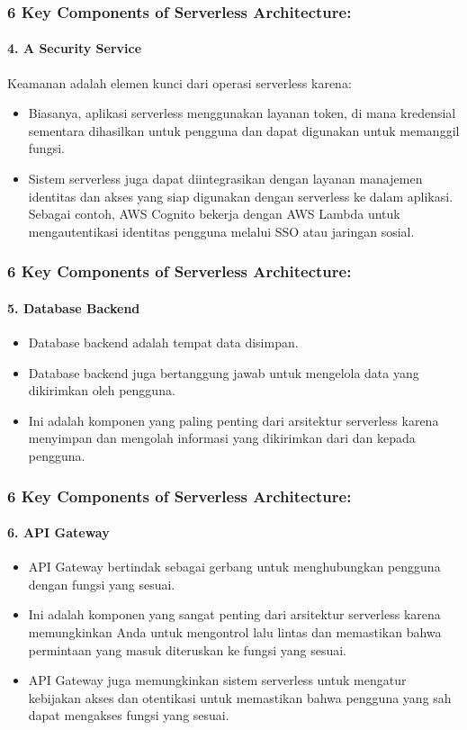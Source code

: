 \documentclass[aspectratio=169, table]{beamer}
\begin{document}
    \begin{frame}\frametitle{6 Key Components of Serverless Architecture:}
        \framesubtitle{4. A Security Service}
        \vspace{20pt}
        Keamanan adalah elemen kunci dari operasi serverless karena:
        \begin{itemize}
            \item Biasanya, aplikasi serverless menggunakan layanan token, di mana kredensial sementara dihasilkan untuk pengguna dan dapat digunakan untuk memanggil fungsi.
            \item Sistem serverless juga dapat diintegrasikan dengan layanan manajemen identitas dan akses yang siap digunakan dengan serverless ke dalam aplikasi. Sebagai contoh, AWS Cognito bekerja dengan AWS Lambda untuk mengautentikasi identitas pengguna melalui SSO atau jaringan sosial.
        \end{itemize}
    \end{frame}


    \begin{frame}\frametitle{6 Key Components of Serverless Architecture: }
        \framesubtitle{5. Database Backend}
        \begin{itemize}
            \item Database backend adalah tempat data disimpan.
            \item Database backend juga bertanggung jawab untuk mengelola data yang dikirimkan oleh pengguna.
            \item Ini adalah komponen yang paling penting dari arsitektur serverless karena menyimpan dan mengolah informasi yang dikirimkan dari dan kepada pengguna.
        \end{itemize}
    \end{frame}

    \begin{frame}\frametitle{6 Key Components of Serverless Architecture:}
        \framesubtitle{6. API Gateway}
        \begin{itemize}
            \item API Gateway bertindak sebagai gerbang untuk menghubungkan pengguna dengan fungsi yang sesuai.
            \item Ini adalah komponen yang sangat penting dari arsitektur serverless karena memungkinkan Anda untuk mengontrol lalu lintas dan memastikan bahwa permintaan yang masuk diteruskan ke fungsi yang sesuai.
            \item API Gateway juga memungkinkan sistem serverless untuk mengatur kebijakan akses dan otentikasi untuk memastikan bahwa pengguna yang sah dapat mengakses fungsi yang sesuai.
        \end{itemize}
    \end{frame}
\end{document}
